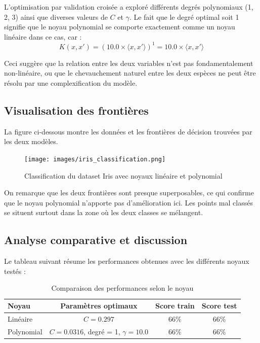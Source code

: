 \documentclass[11pt,a4paper]{article}
\begin{document}
L'optimisation par validation croisée a exploré différents degrés polynomiaux (1, 2, 3) ainsi que diverses valeurs de $C$ et $\gamma$. Le fait que le degré optimal soit 1 signifie que le noyau polynomial se comporte exactement comme un noyau linéaire dans ce cas, car :
\[
K(x,x') = (10.0 \times \langle x, x' \rangle)^1 = 10.0 \times \langle x, x' \rangle
\]

Ceci suggère que la relation entre les deux variables n'est pas fondamentalement non-linéaire, ou que le chevauchement naturel entre les deux espèces ne peut être résolu par une complexification du modèle.

\subsection{Visualisation des frontières}

La figure ci-dessous montre les données et les frontières de décision trouvées par les deux modèles.

\begin{figure}[H]
\centering
\texttt{[image: images/iris\_classification.png]}
\caption{Classification du dataset Iris avec noyaux linéaire et polynomial}
\end{figure}

On remarque que les deux frontières sont presque superposables, ce qui confirme que le noyau polynomial n'apporte pas d'amélioration ici. Les points mal classés se situent surtout dans la zone où les deux classes se mélangent.

\subsection{Analyse comparative et discussion}

Le tableau suivant résume les performances obtenues avec les différents noyaux testés :

\begin{table}[h]
\centering
\begin{tabular}{|l|c|c|c|}
\hline
\textbf{Noyau} & \textbf{Paramètres optimaux} & \textbf{Score train} & \textbf{Score test} \\
\hline
Linéaire & $C = 0.297$ & 66\% & 66\% \\
\hline
Polynomial & $C = 0.0316$, degré = 1, $\gamma = 10.0$ & 66\% & 66\% \\
\hline
\end{tabular}
\caption{Comparaison des performances selon le noyau}
\end{table}
\end{document}
